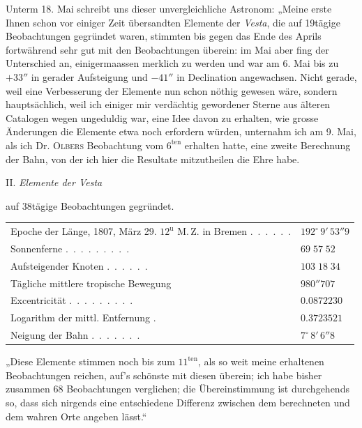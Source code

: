 \par\indent Unterm 18. Mai schreibt uns dieser unvergleichliche Astronom: „Meine erste Ihnen schon vor einiger Zeit übersandten Elemente der \emph{Vesta}, die auf 19tägige Beobachtungen gegründet waren, stimmten bis gegen das Ende des Aprils fortwährend sehr gut mit den Beobachtungen überein: im Mai aber fing der Unterschied an, einigermaassen merklich zu werden und war am 6. Mai bis zu $+33''$ in gerader Aufsteigung und $-41''$ in Declination angewachsen. Nicht gerade, weil eine Verbesserung der Elemente nun schon nöthig gewesen wäre, sondern hauptsächlich, weil ich einiger mir verdächtig gewordener Sterne aus älteren Catalogen wegen ungeduldig war, eine Idee davon zu erhalten, wie grosse Änderungen die Elemente etwa noch erfordern würden, unternahm ich am 9. Mai, als ich Dr. \textsc{Olbers} Beobachtung vom $6^{\text{ten}}$ erhalten hatte, eine zweite Berechnung der Bahn, von der ich hier die Resultate mitzutheilen die Ehre habe.

\begin{center}
II. \emph{Elemente der Vesta}
\end{center}

\begin{center}
auf 38tägige Beobachtungen gegründet.
\end{center}

\begin{center}\begingroup\fontsize{9}{11}\selectfont
\begin{tabular}{ll}
\shortstack[l]{Epoche der Länge, 1807, März 29. $12^{\text{u}}$\\M.\,Z. in Bremen} .\ .\ .\ .\ .\ . & $192^\circ\,9'\,53''9$ \\
Sonnenferne .\ .\ .\ .\ .\ .\ .\ .\ . & $69\;57\;52$ \\
Aufsteigender Knoten .\ .\ .\ .\ .\ . & $103\;18\;34$ \\
Tägliche mittlere tropische Bewegung  & $980''707$ \\
Excentricität .\ .\ .\ .\ .\ .\ .\ .\ . & $0.0872230$ \\
Logarithm der mittl. Entfernung . & $0.3723521$ \\
Neigung der Bahn .\ .\ .\ .\ .\ .\ . & $7^\circ\,8'\,6''8$
\end{tabular}\endgroup\end{center}

\par\indent „Diese Elemente stimmen noch bis zum $11^{\text{ten}}$, als so weit meine erhaltenen Beobachtungen reichen, auf's schönste mit diesen überein; ich habe bisher zusammen 68 Beobachtungen verglichen; die Übereinstimmung ist durchgehends so, dass sich nirgends eine entschiedene Differenz zwischen dem berechneten und dem wahren Orte angeben lässt.“

